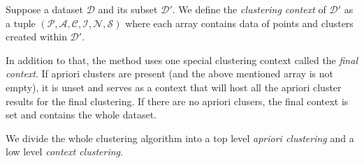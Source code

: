 \begin{defn}
	Suppose a dataset $\mathcal{D}$ and its subset $\mathcal{D}'$. We define the \emph{clustering context} of $\mathcal{D}'$ as a tuple $(\mathcal{P},\mathcal{A},\mathcal{C},\mathcal{I},\mathcal{N},\mathcal{S})$ where each array contains data of points and clusters created within $\mathcal{D}'$.
	\label{def03:context}
\end{defn}

In addition to that, the method uses one special clustering context called the \emph{final context}. If apriori clusters are present (and the above mentioned array is not empty), it is unset and serves as a context that will host all the apriori cluster results for the final clustering. If there are no apriori clusers, the final context is set and contains the whole dataset.

We divide the whole clustering algorithm into a top level \emph{apriori clustering} and a low level \emph{context clustering}.

